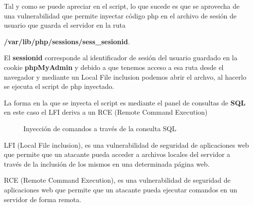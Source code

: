 \documentclass[a4paper]{article}
\begin{document}
\clearpage

Tal y como se puede apreciar en el script, lo que sucede es que se aprovecha de una vulnerabilidad que permite inyectar
código php en el archivo de sesión de usuario que guarda el servidor en la ruta \par
\textbf{\//var\//lib\//php\//sessions\//sess\_sesionid}.\par

El \textbf{sessionid} corresponde al identificador de sesión del usuario guardado en la cookie \textbf{phpMyAdmin} y debido a 
que tenemos acceso a esa ruta desde el navegador y mediante un Local File inclusion podemos abrir el archvo,
al hacerlo se ejecuta el script de php inyectado.\par
La forma en la que se inyecta el script es mediante el panel de consultas de \textbf{SQL} 
en este caso el LFI deriva a un RCE (Remote Command Execution)

\begin{figure}[H]
  \centering
  \setlength{\fboxrule}{0.8pt}
  \caption{Inyección de comandos a través de la consulta SQL}
\end{figure}

\vspace{0.3cm}
\begin{definicion}
  LFI (Local File inclusion), es una vulnerabilidad de seguridad de aplicaciones web que permite que un atacante pueda
  acceder a archivos locales del servidor a través de la inclusión de los mismos en una determinada página web.
\end{definicion}

\vspace{0.3cm}
\begin{definicion}
  RCE (Remote Command Execution), es una vulnerabilidad de seguridad de aplicaciones web que permite que un atacante pueda
  ejecutar comandos en un servidor de forma remota.
\end{definicion}

\clearpage
\end{document}

